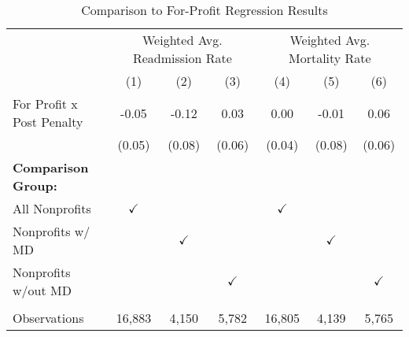 \begin{table}[htbp]
   \caption{\label{tab:forprofit_fullsample} Comparison to For-Profit Regression Results}
   \bigskip
   \centering
   \begin{tabular}{lcccccc}
      \toprule
       & \multicolumn{3}{c}{Weighted Avg. Readmission Rate} & \multicolumn{3}{c}{Weighted Avg. Mortality Rate}\\
                                  & (1)           & (2)           & (3)           & (4)           & (5)           & (6)\\  
      \midrule 
      For Profit x Post Penalty   & -0.05         & -0.12         & 0.03          & 0.00          & -0.01         & 0.06\\   
                                  & (0.05)        & (0.08)        & (0.06)        & (0.04)        & (0.08)        & (0.06)\\   
      \textbf{Comparison Group:}  &               &               &               &               &               & \\  
      All Nonprofits              & $\checkmark$  &               &               & $\checkmark$  &               & \\  
      Nonprofits w/ MD            &               & $\checkmark$  &               &               & $\checkmark$  & \\  
      Nonprofits w/out MD         &               &               & $\checkmark$  &               &               & $\checkmark$\\   
       \\
      Observations                & 16,883        & 4,150         & 5,782         & 16,805        & 4,139         & 5,765\\  
      \bottomrule
   \end{tabular}
\end{table}
